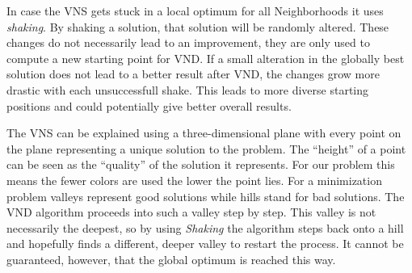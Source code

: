 \documentclass[paper=a4,fontsize=12pt]{scrartcl}
\begin{document}
{In case the VNS gets stuck in a local optimum for all Neighborhoods it uses \emph{shaking}. By shaking a solution, that solution will be randomly altered. These changes do not necessarily lead to an improvement, they are only used to compute a new starting point for VND. If a small alteration in the globally best solution does not lead to a better result after VND, the changes grow more drastic with each unsuccessfull shake. This leads to more diverse starting positions and could potentially give better overall results.


The VNS can be explained using a three-dimensional plane with every point on the plane representing a unique solution to the problem. The \enquote{height} of a point can be seen as the \enquote{quality} of the solution it represents. For our problem this means the fewer colors are used the lower the point lies. For a minimization problem valleys represent good solutions while hills stand for bad solutions. The VND algorithm proceeds into such a valley step by step. This valley is not necessarily the deepest, so by using \emph{Shaking} the algorithm steps back onto a hill and hopefully finds a different, deeper valley to restart the process. It cannot be guaranteed, however, that the global optimum is reached this way.



}
\end{document}
